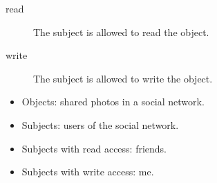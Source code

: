 \begin{frame}
  \begin{example}
    \begin{description}
      \item[read] The subject is allowed to read the object.
      \item[write] The subject is allowed to write the object.
    \end{description}
  \end{example}

  \pause

  \begin{example}
    \begin{itemize}
      \item Objects: shared photos in a social network.
      \item Subjects: users of the social network.
      \item Subjects with read access: friends.
      \item Subjects with write access: me.
    \end{itemize}
  \end{example}
\end{frame}



\begin{frame}
  \small
  \printbibliography
\end{frame}

